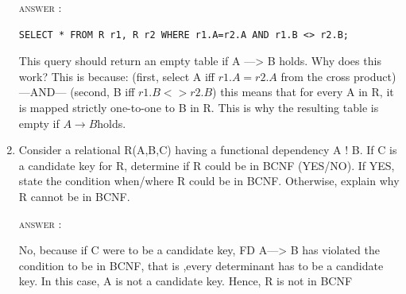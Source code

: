 \documentclass[a4paper, 11pt]{article}
\begin{document}
\begin{enumerate}
\textsc{answer : }

\begin{verbatim}
SELECT * FROM R r1, R r2 WHERE r1.A=r2.A AND r1.B <> r2.B;
\end{verbatim} 
This query should return an empty table if A —> B holds. 
Why does this work? This is because:
(first, select A   iff $ r1.A=r2.A$ from the cross product)—AND— (second, B iff $r1.B <> r2.B$)
this means that for every  A in R, it is mapped strictly one-to-one to B in R.
This is why the resulting table is empty if $A \rightarrow B $holds.
\item Consider a relational R(A,B,C) having a functional dependency A ! B. If C is a candidate key for R, determine if R could be in BCNF (YES/NO). If YES, state the condition when/where R could be in BCNF. Otherwise, explain why R cannot be in BCNF.

\textsc{answer : }

No, because if C were to be a candidate key, FD A—> B has violated the condition to be in BCNF, that is ,every determinant has to be a candidate key. In this case, A is not a candidate key. Hence, R is not in BCNF

\end{enumerate}
\end{document}
